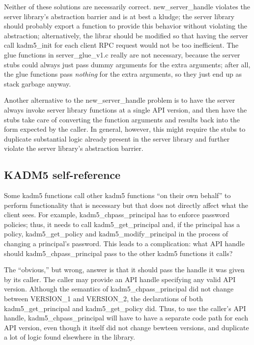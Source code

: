Neither of these solutions are necessarily correct.  new_server_handle
violates the server library's abstraction barrier and is at best a
kludge; the server library should probably export a function to
provide this behavior without violating the abstraction;
alternatively, the librar should be modified so that having the server
call kadm5_init for each client RPC request would not be too
inefficient.  The glue functions in server_glue_v1.c really are not
necessary, because the server stubs could always just pass dummy
arguments for the extra arguments; after all, the glue functions pass
{\it nothing} for the extra arguments, so they just end up as stack
garbage anyway.

Another alternative to the new_server_handle problem is to have the
server always invoke server library functions at a single API version,
and then have the stubs take care of converting the function arguments
and results back into the form expected by the caller.  In general,
however, this might require the stubs to duplicate substantial logic
already present in the server library and further violate the server
library's abstraction barrier.

\subsection{KADM5 self-reference}

Some kadm5 functions call other kadm5 functions ``on their own
behalf'' to perform functionality that is necessary but that does not
directly affect what the client sees.  For example,
kadm5_chpass_principal has to enforce password policies; thus, it
needs to call kadm5_get_principal and, if the principal has a policy,
kadm5_get_policy and kadm5_modify_principal in the process of changing
a principal's password.  This leads to a complication: what API handle
should kadm5_chpass_principal pass to the other kadm5 functions it
calls?

The ``obvious,'' but wrong, answer is that it should pass the handle
it was given by its caller.  The caller may provide an API handle
specifying any valid API version.  Although the semantics of
kadm5_chpass_principal did not change between VERSION_1 and VERSION_2,
the declarations of both kadm5_get_principal and kadm5_get_policy
did.  Thus, to use the caller's API handle, kadm5_chpass_principal
will have to have a separate code path for each API version, even
though it itself did not change bewteen versions, and duplicate a lot
of logic found elsewhere in the library.

